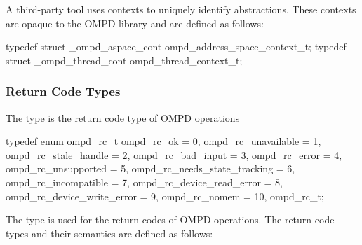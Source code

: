 \summary
A third-party tool uses contexts to uniquely identify abstractions. These 
contexts are opaque to the OMPD library and are defined as follows:

\format
\begin{ccppspecific}
\begin{ompSyntax}
typedef struct _ompd_aspace_cont ompd_address_space_context_t;
typedef struct _ompd_thread_cont ompd_thread_context_t;
\end{ompSyntax}
\end{ccppspecific}



\subsubsection{Return Code Types}
\label{subsubsec:ompd_rc_t}

\summary
The  type is the return code type of OMPD operations

\format
\begin{ccppspecific}
\begin{ompSyntax}
typedef enum ompd_rc_t {
  ompd_rc_ok = 0,
  ompd_rc_unavailable = 1,
  ompd_rc_stale_handle = 2,
  ompd_rc_bad_input = 3,
  ompd_rc_error = 4,
  ompd_rc_unsupported = 5,
  ompd_rc_needs_state_tracking = 6,
  ompd_rc_incompatible = 7,
  ompd_rc_device_read_error = 8,
  ompd_rc_device_write_error = 9,
  ompd_rc_nomem = 10,
} ompd_rc_t;
\end{ompSyntax}
\end{ccppspecific}


\descr
The  type is used for the return codes of OMPD operations. 
The return code types and their semantics are defined as follows:


